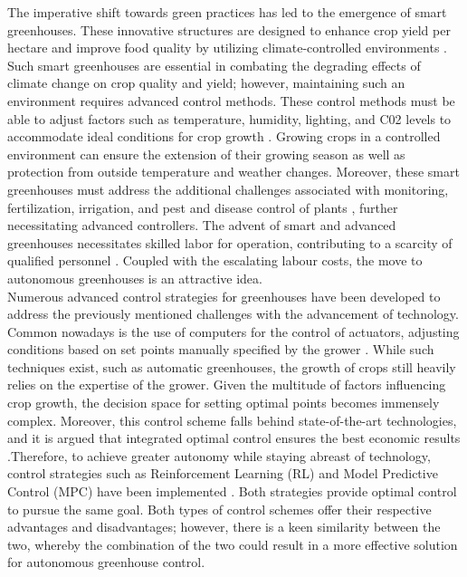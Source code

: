 The imperative shift towards green practices has led to the emergence of smart greenhouses. These innovative structures are designed to enhance crop yield per hectare and improve food quality by utilizing climate-controlled environments \cite{morcegoReinforcementLearningModel2023}. Such smart greenhouses are essential in combating the degrading effects of climate change on crop quality and yield; however, maintaining such an environment requires advanced control methods. These control methods must be able to adjust factors such as temperature, humidity, lighting, and C02 levels to accommodate ideal conditions for crop growth \cite{devopsGreenhouseClimateControl2021}. Growing crops in a controlled environment can ensure the extension of their growing season as well as protection from outside temperature and weather changes. Moreover, these smart greenhouses must address the additional challenges associated with monitoring, fertilization, irrigation, and pest and disease control of plants \cite{sahooSmartGreenhouseBoon2022}, further necessitating advanced controllers. The advent of smart and advanced greenhouses necessitates skilled labor for operation, contributing to a scarcity of qualified personnel \cite{rusnakWhatCurrentState2018}. Coupled with the escalating labour costs, the move to autonomous greenhouses is an attractive idea. \\


Numerous advanced control strategies for greenhouses have been developed to address the previously mentioned challenges with the advancement of technology. Common nowadays is the use of computers for the control of actuators, adjusting conditions based on set points manually specified by the grower \cite{zhangMethodologiesControlStrategies2020}. While such techniques exist, such as automatic greenhouses, the growth of crops still heavily relies on the expertise of the grower. Given the multitude of factors influencing crop growth, the decision space for setting optimal points becomes immensely complex.  Moreover, this control scheme falls behind state-of-the-art technologies, and it is argued that integrated optimal control ensures the best economic results \cite{vanstratenOptimalGreenhouseCultivation2010}.Therefore, to achieve greater autonomy while staying abreast of technology, control strategies such as Reinforcement Learning (RL) and Model Predictive Control (MPC) have been implemented \cite{zhangMethodologiesControlStrategies2020}. Both strategies provide optimal control to pursue the same goal.  Both types of control schemes offer their respective advantages and disadvantages; however, there is a keen similarity between the two, whereby the combination of the two could result in a more effective solution for autonomous greenhouse control.


